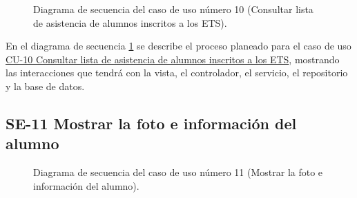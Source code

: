 \begin{figure}[htbp!]
	\begin{center}
		\caption{Diagrama de secuencia del caso de uso número 10 (Consultar lista de asistencia de alumnos inscritos a los ETS).}
		\label{fig:Diagrama de secuencia CU-10}
	\end{center}
\end{figure}

En el diagrama de secuencia \ref{fig:Diagrama de secuencia CU-10} se describe el proceso planeado para el caso de uso \hyperlink{CU-10}{CU-10 Consultar lista de asistencia de alumnos inscritos a los ETS}, mostrando las interacciones que tendrá con la vista, el controlador, el servicio, el repositorio y la base de datos.

\newpage

\subsection{SE-11 Mostrar la foto e información  del alumno}

\begin{figure}[htbp!]
	\begin{center}
		\caption{Diagrama de secuencia del caso de uso número 11 (Mostrar la foto e información  del alumno).}
		\label{fig:Diagrama de secuencia CU-11}
	\end{center}
\end{figure}


